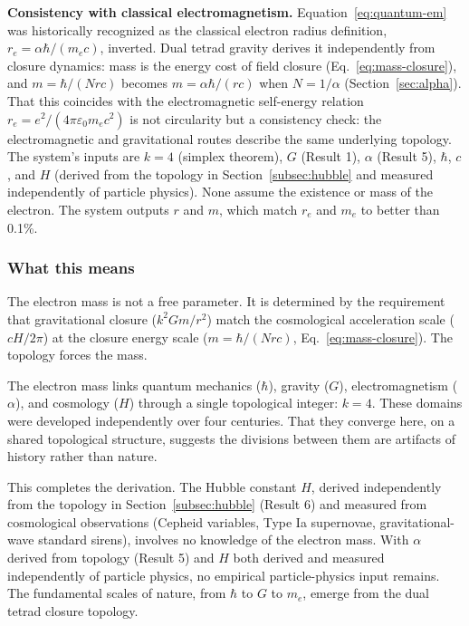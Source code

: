 \documentclass[aps,prd,preprint,superscriptaddress,showpacs,preprintnumbers,amsmath,amssymb,nofootinbib]{revtex4-2}
\begin{document}
\textbf{Consistency with classical electromagnetism.} Equation~\ref{eq:quantum-em} was historically recognized as the classical electron radius definition, $r_e = \alpha\hbar/(m_e c)$, inverted. Dual tetrad gravity derives it independently from closure dynamics: mass is the energy cost of field closure (Eq.~\ref{eq:mass-closure}), and $m = \hbar/(Nrc)$ becomes $m = \alpha\hbar/(rc)$ when $N = 1/\alpha$ (Section~\ref{sec:alpha}). That this coincides with the electromagnetic self-energy relation $r_e = e^2/(4\pi\varepsilon_0 m_e c^2)$ is not circularity but a consistency check: the electromagnetic and gravitational routes describe the same underlying topology. The system's inputs are $k = 4$ (simplex theorem), $G$ (Result 1), $\alpha$ (Result 5), $\hbar$, $c$, and $H$ (derived from the topology in Section~\ref{subsec:hubble} and measured independently of particle physics). None assume the existence or mass of the electron. The system outputs $r$ and $m$, which match $r_e$ and $m_e$ to better than 0.1\%.

\subsubsection*{What this means}

The electron mass is not a free parameter. It is determined by the requirement that gravitational closure ($k^2 G m/r^2$) match the cosmological acceleration scale ($cH/2\pi$) at the closure energy scale ($m = \hbar/(Nrc)$, Eq.~\ref{eq:mass-closure}). The topology forces the mass.

The electron mass links quantum mechanics ($\hbar$), gravity ($G$), electromagnetism ($\alpha$), and cosmology ($H$) through a single topological integer: $k = 4$. These domains were developed independently over four centuries. That they converge here, on a shared topological structure, suggests the divisions between them are artifacts of history rather than nature.

This completes the derivation. The Hubble constant $H$, derived independently from the topology in Section~\ref{subsec:hubble} (Result 6) and measured from cosmological observations (Cepheid variables, Type Ia supernovae, gravitational-wave standard sirens), involves no knowledge of the electron mass. With $\alpha$ derived from topology (Result 5) and $H$ both derived and measured independently of particle physics, no empirical particle-physics input remains. The fundamental scales of nature, from $\hbar$ to $G$ to $m_e$, emerge from the dual tetrad closure topology.
\end{document}
